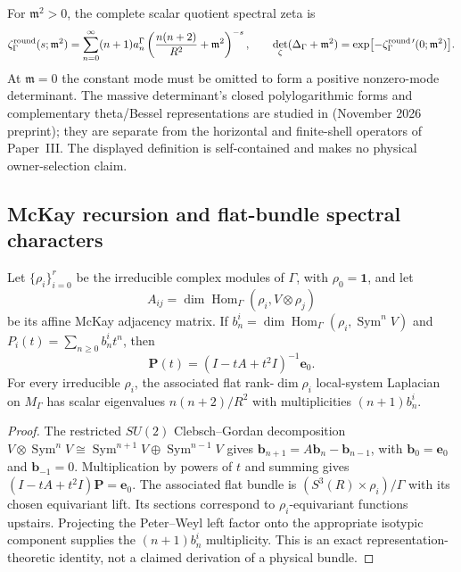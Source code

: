 \documentclass[11pt]{article}
\begin{document}
\begin{definition}
\label{p1b:def:v12-massive-scalar-zeta}
For $\mathfrak m^2>0$, the complete scalar quotient spectral zeta is
\[
 \zeta^{\rm round}_{\Gamma}(s;\mathfrak m^2)
 =\sum_{n=0}^\infty (n+1)a_n^\Gamma
 \left(\frac{n(n+2)}{R^2}+\mathfrak m^2\right)^{-s},
\qquad
 \det_\zeta(\Delta_\Gamma+\mathfrak m^2)
 =\exp\bigl[-\zeta^{\rm round\,\prime}_\Gamma(0;\mathfrak m^2)\bigr].
\]
At $\mathfrak m=0$ the constant mode must be omitted to form a
positive nonzero-mode determinant.  The massive determinant's
closed polylogarithmic forms and complementary theta/Bessel
representations are studied in
\cite{MartinMerinoPoddarRoby2026SpaceForms} (November 2026
preprint); they are separate from the horizontal and finite-shell
operators of Paper~III.  The displayed definition is self-contained
and makes no physical owner-selection claim.
\end{definition}

\subsection{McKay recursion and flat-bundle spectral characters}
\label{p1b:subsec:v12-mckay-spectral}

\begin{theorem}
\label{p1b:thm:v12-mckay-resolvent}
Let $\{\rho_i\}_{i=0}^{r}$ be the irreducible complex modules
of $\Gamma$, with $\rho_0=\mathbf1$, and let
\[
 A_{ij}=\dim\operatorname{Hom}_\Gamma
  (\rho_i,V\otimes\rho_j)
\]
be its affine McKay adjacency matrix.  If
$b_n^i=\dim\operatorname{Hom}_\Gamma
(\rho_i,\operatorname{Sym}^nV)$ and
$P_i(t)=\sum_{n\ge0}b_n^i t^n$, then
\[
 \boxed{\mathbf P(t)=(I-tA+t^2 I)^{-1}\mathbf e_0.}
\]
For every irreducible $\rho_i$, the associated flat rank-$\dim\rho_i$
local-system Laplacian on $M_\Gamma$ has scalar eigenvalues
$n(n+2)/R^2$ with multiplicities $(n+1)b_n^i$.
\end{theorem}
\begin{proof}
The restricted $SU(2)$ Clebsch--Gordan decomposition
$V\otimes\operatorname{Sym}^nV\cong
\operatorname{Sym}^{n+1}V\oplus\operatorname{Sym}^{n-1}V$
gives $\mathbf b_{n+1}=A\mathbf b_n-\mathbf b_{n-1}$,
with $\mathbf b_0=\mathbf e_0$ and $\mathbf b_{-1}=0$.
Multiplication by powers of $t$ and summing gives
$(I-tA+t^2I)\mathbf P=\mathbf e_0$.
The associated flat bundle is
$(S^3(R)\times\rho_i)/\Gamma$ with its chosen equivariant
lift.  Its sections correspond to $\rho_i$-equivariant functions
upstairs.  Projecting the Peter--Weyl left factor onto the
appropriate isotypic component supplies the $(n+1)b_n^i$
multiplicity.  This is an exact representation-theoretic identity,
not a claimed derivation of a physical bundle.
\end{proof}
\end{document}
